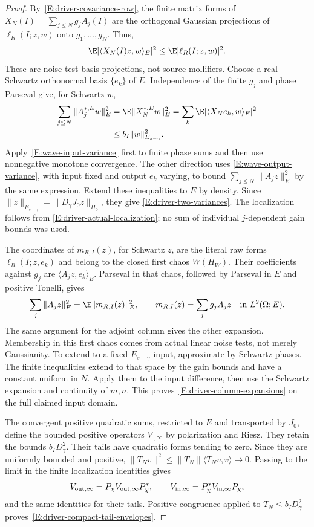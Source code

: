 \begin{proof}
  By~\eqref{E:driver-covariance-row}, the finite matrix forms of
  $X_N(I)=\sum_{j\le N}g_jA_j(I)$ are the orthogonal Gaussian projections
  of $\ell_R(I;z,w)$ onto $g_1,\ldots,g_N$. Thus,
  \[
    \E|\langle X_N(I)z,w\rangle_E|^2\le\E|\ell_R(I;z,w)|^2.
  \]
  These are noise-test-basis projections, not source mollifiers. Choose
  a real Schwartz orthonormal basis $\{e_k\}$ of $E$. Independence of the
  finite $g_j$ and phase Parseval give, for Schwartz $w$,
  \begin{align*}
    \sum_{j\le N}\|A_j^{*,E}w\|_E^2
    &=\E\|X_N^{*,E}w\|_E^2
    =\sum_k\E|\langle X_Ne_k,w\rangle_E|^2\\
    &\le b_I\|w\|_{E_{s-\gamma}}^2.
  \end{align*}
  Apply~\eqref{E:wave-input-variance} first to finite phase sums and then
  use nonnegative monotone convergence. The other direction uses
  \eqref{E:wave-output-variance}, with input fixed and output $e_k$ varying,
  to bound $\sum_{j\le N}\|A_jz\|_E^2$ by the same expression. Extend
  these inequalities to $E$ by density. Since
  $\|z\|_{E_{s-\gamma}}=\|D_\gamma J_0z\|_{H_0}$, they give
  \eqref{E:driver-two-variances}. The localization follows from
  \eqref{E:driver-actual-localization}; no sum of individual
  $j$-dependent gain bounds was used.

  The coordinates of $m_{R,I}(z)$, for Schwartz $z$, are the literal raw
  forms $\ell_R(I;z,e_k)$ and belong to the closed first chaos $W(H_W)$.
  Their coefficients against $g_j$ are $\langle A_jz,e_k\rangle_E$.
  Parseval in that chaos, followed by Parseval in $E$ and positive Tonelli,
  gives
  \[
    \sum_j\|A_jz\|_E^2=\E\|m_{R,I}(z)\|_E^2,
    \qquad m_{R,I}(z)=\sum_jg_jA_jz\quad\text{in }L^2(\Omega;E).
  \]
  The same argument for the adjoint column gives the other expansion.
  Membership in this first chaos comes from actual linear noise tests,
  not merely Gaussianity. To extend to a fixed $E_{s-\gamma}$ input,
  approximate by Schwartz phases. The finite inequalities extend to that
  space by the gain bounds and have a constant uniform in $N$. Apply them
  to the input difference, then use the Schwartz expansion and continuity
  of $m,n$. This proves~\eqref{E:driver-column-expansions} on the full
  claimed input domain.

  The convergent positive quadratic sums, restricted to $E$ and transported
  by $J_0$, define the bounded positive operators $V_{\cdot,\infty}$ by
  polarization and Riesz. They retain the bounds $b_ID_\gamma^2$.
  Their tails have quadratic forms tending to zero. Since they are uniformly
  bounded and positive,
  $\|T_Nv\|^2\le\|T_N\|\langle T_Nv,v\rangle\to0$.
  Passing to the limit in the finite localization identities gives
  \[
    V_{{\rm out},\infty}=P_\chi V_{{\rm out},\infty}P_\chi^*,\qquad
    V_{{\rm in},\infty}=P_\chi^*V_{{\rm in},\infty}P_\chi,
  \]
  and the same identities for their tails. Positive congruence applied to
  $T_N\le b_ID_\gamma^2$ proves~\eqref{E:driver-compact-tail-envelopes}.


\end{proof}
